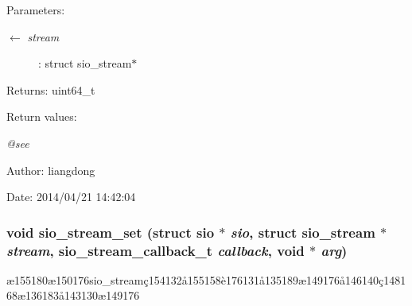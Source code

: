 \begin{Desc}
\item[Parameters:]
\begin{description}
\item[\mbox{$\leftarrow$} {\em stream}]: struct sio\_\-stream$\ast$ \end{description}
\end{Desc}
\begin{Desc}
\item[Returns:]uint64\_\-t \end{Desc}
\begin{Desc}
\item[Return values:]
\begin{description}
\item[{\em @see}]\end{description}
\end{Desc}
\begin{Desc}
\item[Author:]liangdong \end{Desc}
\begin{Desc}
\item[Date:]2014/04/21 14:42:04 \end{Desc}
\subsubsection{\setlength{\rightskip}{0pt plus 5cm}void sio\_\-stream\_\-set (struct sio $\ast$ {\em sio}, struct sio\_\-stream $\ast$ {\em stream}, sio\_\-stream\_\-callback\_\-t {\em callback}, void $\ast$ {\em arg})}\label{sio__stream_8c_a13}


\ae{}155180\ae{}150176sio\_\-stream\c{c}154132\aa{}155158\`{e}176131\aa{}135189\ae{}149176\aa{}146140\c{c}148168\ae{}136183\aa{}143130\ae{}149176 

